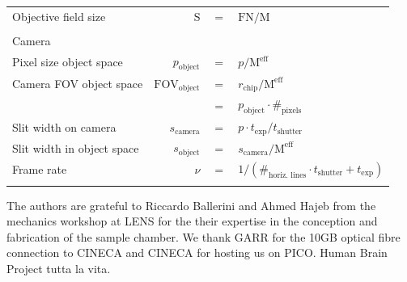 \documentclass[12pt]{spieman}  %
\begin{document}
\begin{table}[t!]
\begin{tabular}{lrcl}
		Objective field size							& S															& $=$					& $\text{FN}/{\text{M}}$								\\\\
		\multicolumn{4}{l}{Camera}\\\hline\hline  
		Pixel size object space						& $ p_{\text{object}}$					& $=$					& $p/  \text{M}^{\text{eff}}$							\\
		Camera FOV object space						&$\text{FOV}_{\text{object}}$		& $=$					& $r_{\text{chip}} / \text{M}^{\text{eff}}$				\\
																			&																& $=$					& $p_{\text{object}} \cdot \#_{\text{pixels}}$			\\
		Slit width on camera							& $s_{\text{camera}}$						& $=$					& $ p \cdot t_{\text{exp}} / t_{\text{shutter}} $			\\
		Slit width in object space				& $s_{\text{object}}$						& $=$					& $ s_{\text{camera}}/ \text{M}^{\text{eff}}$			\\
		Frame rate												& $\nu$													& $=$					& $1/(\#_{\text{horiz. lines}} \cdot t_{\text{shutter}} + t_{\text{exp}})$ \\\\

		\end{tabular}
\end{table}
	


\acknowledgments
The authors are grateful to Riccardo Ballerini and Ahmed Hajeb from the mechanics workshop at LENS for the their expertise in the conception and fabrication of the sample chamber. We thank GARR for the 10GB optical fibre connection to CINECA and  CINECA for hosting us on PICO. Human Brain Project tutta la vita. 


\end{document}
